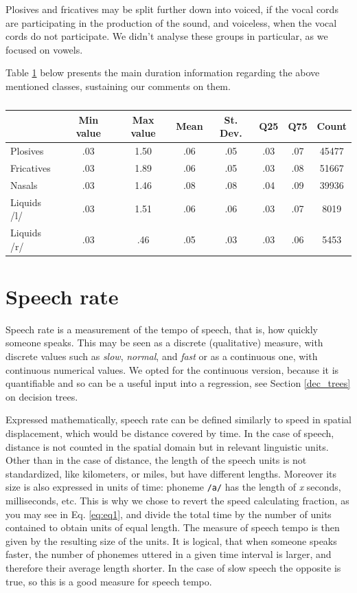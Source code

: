\documentclass[11pt,a4paper]{scrbook}
\begin{document}
Plosives and fricatives may be split further down into voiced, if the vocal cords are participating in the production of the sound, and voiceless, when the vocal cords do not participate. We didn't analyse these groups in particular, as we focused on vowels. 

Table \ref{tab:cons_stats} below presents the main duration information regarding the above mentioned classes, sustaining our comments on them.
\begin{table}[htbp]
\centering
\begin{tabular}{|l|c|c|c|c|c|c|c|}

\hline
	 & Min value & Max value & Mean & St. Dev. & Q25 & Q75 & Count\\
\hline
\hline
Plosives  	& .03  & 1.50 & .06 & .05 & .03 & .07 & 45477\\
	\hline
Fricatives   & .03 & 1.89 &  .06 & .05 & .03 & .08 & 51667\\
	\hline
Nasals  &  .03 & 1.46 & .08 & .08 & .04 & .09 & 39936 \\
	\hline
Liquids /l/ & .03 & 1.51 & .06 & .06 & .03 & .07 & 8019 \\
	\hline
Liquids /r/ & .03 & .46 & .05 & .03 &  .03 & .06 & 5453 \\
	\hline
\end{tabular}
\vspace{4mm}
\caption{} 
\label{tab:cons_stats}
\end{table}

\chapter{Speech rate}
\label{chap_SR}
Speech rate is a measurement of the tempo of speech, that is, how quickly someone speaks. This may be seen as a discrete (qualitative) measure, with discrete values such as \textit{slow}, \textit{normal}, and \textit{fast} or as a continuous one, with continuous numerical values. We opted for the continuous version, because it is quantifiable and so can be a useful input into a regression, see Section \ref{dec_trees} on decision trees.

Expressed mathematically, speech rate can be defined similarly to speed in spatial displacement, which would be distance covered by time. In the case of speech, distance is not counted in the spatial domain but in relevant linguistic units. Other than in the case of distance, the length of the speech units is not standardized, like kilometers, or miles, but have different lengths. Moreover its size is also expressed in units of time: phoneme \texttt{/a/} has the length of \textit{x} seconds, milliseconds, etc. This is why we chose to revert the speed calculating fraction, as you may see in Eq. \ref{eq:eq1}, and divide the total time by the number of units contained to obtain units of equal length. The measure of speech tempo is then given by the resulting size of the units. It is logical, that when someone speaks faster, the number of phonemes uttered in a given time interval is larger, and therefore their average length shorter. In the case of slow speech the opposite is true, so this is a good measure for speech tempo.
\end{document}
